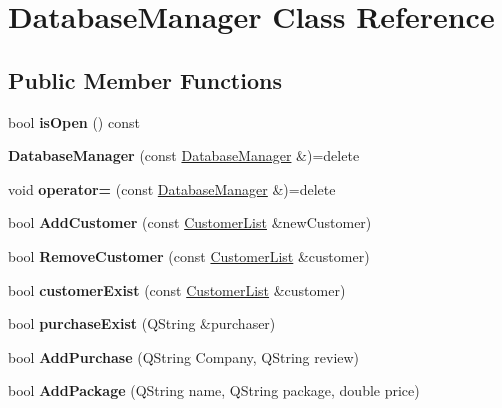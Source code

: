 \hypertarget{class_database_manager}{}\section{Database\+Manager Class Reference}
\label{class_database_manager}
\subsection*{Public Member Functions}
\begin{DoxyCompactItemize}
\item 
\mbox{\label{class_database_manager_af1c0598acf843b8e970053f17fc845f1}} 
bool {\bfseries is\+Open} () const
\item 
\mbox{\label{class_database_manager_aefa3d6eae7782904f5d758462b573b1e}} 
{\bfseries Database\+Manager} (const \mbox{\hyperlink{class_database_manager}{Database\+Manager}} \&)=delete
\item 
\mbox{\label{class_database_manager_acf8defd44bb315a62c6ef9ed10ea52c0}} 
void {\bfseries operator=} (const \mbox{\hyperlink{class_database_manager}{Database\+Manager}} \&)=delete
\item 
\mbox{\label{class_database_manager_a0355bb13d0608acf18773a6321ed2765}} 
bool {\bfseries Add\+Customer} (const \mbox{\hyperlink{class_customer_list}{Customer\+List}} \&new\+Customer)
\item 
\mbox{\label{class_database_manager_a76c778c9089b97504ea517a575bb95c7}} 
bool {\bfseries Remove\+Customer} (const \mbox{\hyperlink{class_customer_list}{Customer\+List}} \&customer)
\item 
\mbox{\label{class_database_manager_a7e5b964348b1b4b83a20880443a6d714}} 
bool {\bfseries customer\+Exist} (const \mbox{\hyperlink{class_customer_list}{Customer\+List}} \&customer)
\item 
\mbox{\label{class_database_manager_a5da7ab3f2b017bb9b2482dc8757cf487}} 
bool {\bfseries purchase\+Exist} (Q\+String \&purchaser)
\item 
\mbox{\label{class_database_manager_a8c125d96cdb57761e391849c0e3de35d}} 
bool {\bfseries Add\+Purchase} (Q\+String Company, Q\+String review)
\item 
\mbox{\label{class_database_manager_ad25114d420edce2c5e755594b5da6949}} 
bool {\bfseries Add\+Package} (Q\+String name, Q\+String package, double price)
\end{DoxyCompactItemize}
